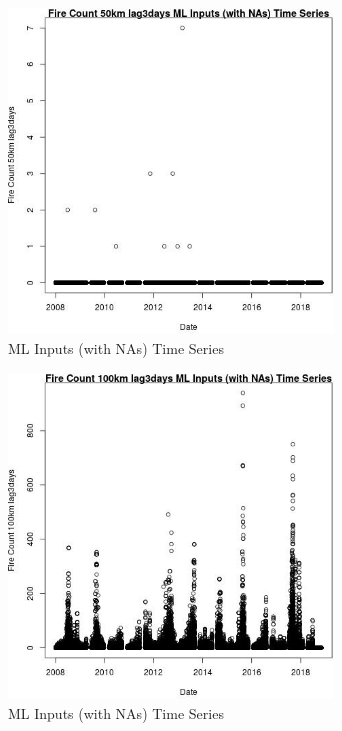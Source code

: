 \begin{figure} 
\centering  
\includegraphics[width=0.77\textwidth]{Code_Outputs/Report_ML_input_PM25_Step4_part_e_de_duplicated_aves_compiled_2019-05-20wNAs_Fire_Count_50km_lag3daysvDate.jpg} 
\caption{\label{fig:Report_ML_input_PM25_Step4_part_e_de_duplicated_aves_compiled_2019-05-20wNAsFire_Count_50km_lag3daysvDate}ML Inputs (with NAs) Time Series} 
\end{figure} 
 

\begin{figure} 
\centering  
\includegraphics[width=0.77\textwidth]{Code_Outputs/Report_ML_input_PM25_Step4_part_e_de_duplicated_aves_compiled_2019-05-20wNAs_Fire_Count_100km_lag3daysvDate.jpg} 
\caption{\label{fig:Report_ML_input_PM25_Step4_part_e_de_duplicated_aves_compiled_2019-05-20wNAsFire_Count_100km_lag3daysvDate}ML Inputs (with NAs) Time Series} 
\end{figure} 
 

